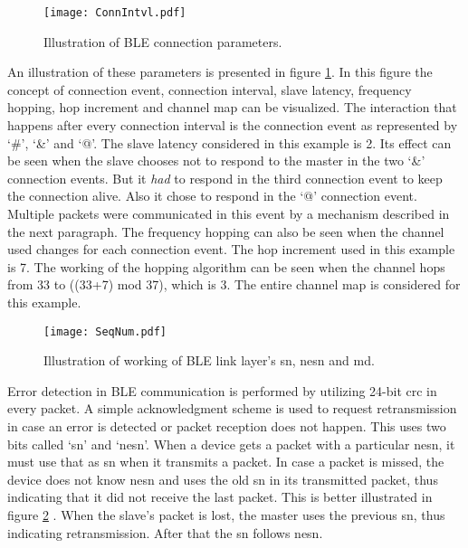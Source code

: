 \begin{figure}[h]
\centering
\texttt{[image: ConnIntvl.pdf]}
\caption{Illustration of BLE connection parameters.}
\label{fig:ConnIntvl}
\vspace{-5pt}
\end{figure}

An illustration of these parameters is presented in figure \ref{fig:ConnIntvl}. In this figure the concept of connection event, connection interval, slave latency, frequency hopping, hop increment and channel map can be visualized. The interaction that happens after every connection interval is the connection event as represented by `\#', `\&' and `@'. The slave latency considered in this example is 2. Its effect can be seen when the slave chooses not to respond to the master in the two `\&' connection events. But it \emph{had} to respond in the third connection event to keep the connection alive. Also it chose to respond in the `@' connection event. Multiple packets were communicated in this event by a mechanism described in the next paragraph. The frequency hopping can also be seen when the channel used changes for each connection event. The hop increment used in this example is 7. The working of the hopping algorithm can be seen when the channel hops from 33 to ((33+7) mod 37), which is 3. The entire channel map is considered for this example. 


\begin{figure}[h]
\centering
\texttt{[image: SeqNum.pdf]}
\caption{Illustration of working of BLE link layer's \gls{sn}, \gls{nesn} and \acrshort{md}.}
\label{fig:SeqNum}
\end{figure}

Error detection in BLE communication is performed by utilizing 24-bit \gls{crc} in every packet. A simple acknowledgment scheme is used to request retransmission in case an error is detected or packet reception does not happen. This uses two bits called `\gls{sn}' and `\gls{nesn}'. When a device gets a packet with a particular \gls{nesn},  it must use that as \gls{sn} when it transmits a packet. In case a packet is missed, the device does not know \gls{nesn} and uses the old \gls{sn} in its transmitted packet, thus indicating that it did not receive the last packet. This is better illustrated in figure \ref{fig:SeqNum} \cite{Heydon2012}. When the slave's packet is lost, the master uses the previous \gls{sn}, thus indicating retransmission. After that the \gls{sn} follows \gls{nesn}.

